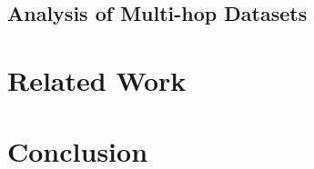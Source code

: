 \documentclass[sigplan,screen]{acmart}
\begin{document}

\subsection{Analysis of Multi-hop Datasets}

\section{Related Work}

\section{Conclusion}



\end{document}
